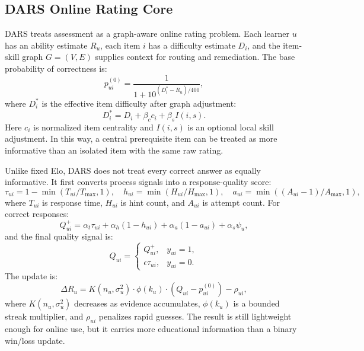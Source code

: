 \documentclass[conference]{IEEEtran}
\begin{document}
\subsection{DARS Online Rating Core}

DARS treats assessment as a graph-aware online rating problem. Each learner $u$ has an ability estimate $R_u$, each item $i$ has a difficulty estimate $D_i$, and the item-skill graph $G=(V,E)$ supplies context for routing and remediation. The base probability of correctness is:
\begin{equation}
p_{ui}^{(0)}=\frac{1}{1+10^{(D_i^\ast-R_u)/400}},
\end{equation}
where $D_i^\ast$ is the effective item difficulty after graph adjustment:
\begin{equation}
D_i^\ast = D_i + \beta_c c_i + \beta_s I(i,s).
\end{equation}
Here $c_i$ is normalized item centrality and $I(i,s)$ is an optional local skill adjustment. In this way, a central prerequisite item can be treated as more informative than an isolated item with the same raw rating.

Unlike fixed Elo, DARS does not treat every correct answer as equally informative. It first converts process signals into a response-quality score:
\begin{equation}
\tau_{ui}=1-\min(T_{ui}/T_{\max},1), \quad
h_{ui}=\min(H_{ui}/H_{\max},1), \quad
a_{ui}=\min((A_{ui}-1)/A_{\max},1),
\end{equation}
where $T_{ui}$ is response time, $H_{ui}$ is hint count, and $A_{ui}$ is attempt count. For correct responses:
\begin{equation}
Q_{ui}^{+}=\alpha_t\tau_{ui}+\alpha_h(1-h_{ui})+\alpha_a(1-a_{ui})+\alpha_s\psi_u,
\end{equation}
and the final quality signal is:
\begin{equation}
Q_{ui} =
\begin{cases}
Q_{ui}^{+}, & y_{ui}=1,\\
\epsilon\tau_{ui}, & y_{ui}=0.
\end{cases}
\end{equation}
The update is:
\begin{equation}
\Delta R_u = K(n_u,\sigma_u^2)\cdot \phi(k_u)\cdot(Q_{ui}-p_{ui}^{(0)})-\rho_{ui},
\end{equation}
where $K(n_u,\sigma_u^2)$ decreases as evidence accumulates, $\phi(k_u)$ is a bounded streak multiplier, and $\rho_{ui}$ penalizes rapid guesses. The result is still lightweight enough for online use, but it carries more educational information than a binary win/loss update.
\end{document}
